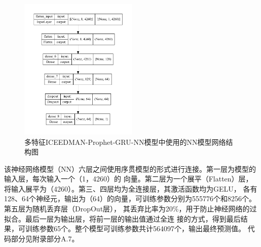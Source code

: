 \documentclass[AutoFakeBold]{LZUThesis}
\begin{document}
\begin{figure}[H]
	\centering
    \includegraphics[width=0.5\textwidth]{figures/all_feature_prophet_gru_nnmodel_plot.pdf}
    \caption{多特征ICEEDMAN-Prophet-GRU-NN模型中使用的NN模型网络结构图}
    \label{fig_gru_nn}
\end{figure}

该神经网络模型（NN）六层之间使用序贯模型的形式进行连接。第一层为模型的输入层，每次输入一个（1，4260）的
向量。第二层为一个展平（Flatten）层，将输入展平为（4260）。第三、四层均为全连接层，其激活函数均为GELU，
各有128、64个神经元，输出为（64）的向量，可训练参数分别为555776个和8256个。第五层为随机丢弃层（DropOut层），
其丢弃比率为20\%，用于防止神经网络的过拟合。最后一层为输出层，将前一层的输出值通过全连
接的方式，得到最后结果，可训练参数65个。整个模型可训练参数共计564097个，输出最终预测值。
代码部分见附录部分A.7。
\end{document}
